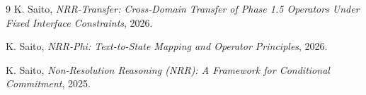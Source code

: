 \documentclass[11pt,a4paper]{article}
\begin{document}
\begin{thebibliography}{9}
K. Saito,
\textit{NRR-Transfer: Cross-Domain Transfer of Phase 1.5 Operators Under Fixed Interface Constraints},
2026.

K. Saito,
\textit{NRR-Phi: Text-to-State Mapping and Operator Principles},
2026.

K. Saito,
\textit{Non-Resolution Reasoning (NRR): A Framework for Conditional Commitment},
2025.
\end{thebibliography}
\end{document}

